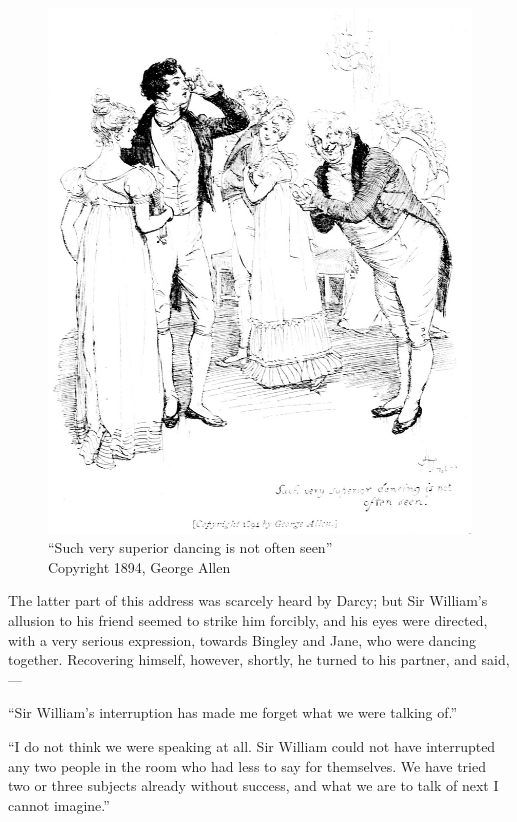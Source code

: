 \begin{figure}[htbp]
    \centering
    \includegraphics[width=\textwidth]{illustrations/i_147.jpg}
    \caption{“Such very superior dancing is not often seen”\\ Copyright 1894, George Allen}
    \label{fig:image}
\end{figure}

The latter part of this address was scarcely heard by Darcy; but Sir William's allusion to his friend seemed to strike him forcibly, and his eyes were directed, with a very serious expression, towards Bingley and Jane, who were dancing together. Recovering himself, however, shortly, he turned to his partner, and said,---

``Sir William's interruption has made me forget what we were talking of.''

``I do not think we were speaking at all. Sir William could not have interrupted any two people in the room who had less to say for themselves. We have tried two or three subjects already without success, and what we are to talk of next I cannot imagine.''


